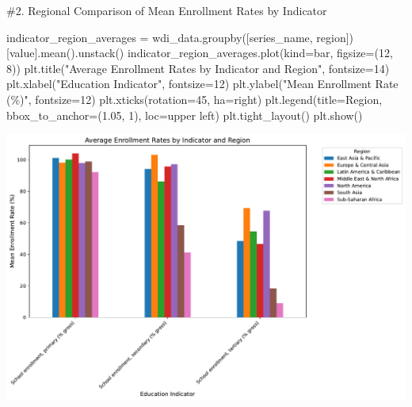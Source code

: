 \documentclass[
  letterpaper,
  DIV=11,
  numbers=noendperiod]{scrartcl}
\newenvironment{Shaded}{\begin{snugshade}}{\end{snugshade}}
\newcommand{\CommentTok}[1]{\textcolor[rgb]{0.37,0.37,0.37}{#1}}
\newcommand{\DecValTok}[1]{\textcolor[rgb]{0.68,0.00,0.00}{#1}}
\newcommand{\FloatTok}[1]{\textcolor[rgb]{0.68,0.00,0.00}{#1}}
\newcommand{\NormalTok}[1]{\textcolor[rgb]{0.00,0.23,0.31}{#1}}
\newcommand{\OperatorTok}[1]{\textcolor[rgb]{0.37,0.37,0.37}{#1}}
\newcommand{\StringTok}[1]{\textcolor[rgb]{0.13,0.47,0.30}{#1}}
\begin{document}
\begin{Shaded}
\begin{Highlighting}[]
\CommentTok{\#2. Regional Comparison of Mean Enrollment Rates by Indicator}

\NormalTok{indicator\_region\_averages }\OperatorTok{=}\NormalTok{ wdi\_data.groupby([}\StringTok{\textquotesingle{}series\_name\textquotesingle{}}\NormalTok{, }\StringTok{\textquotesingle{}region\textquotesingle{}}\NormalTok{])[}\StringTok{\textquotesingle{}value\textquotesingle{}}\NormalTok{].mean().unstack()}
\NormalTok{indicator\_region\_averages.plot(kind}\OperatorTok{=}\StringTok{\textquotesingle{}bar\textquotesingle{}}\NormalTok{, figsize}\OperatorTok{=}\NormalTok{(}\DecValTok{12}\NormalTok{, }\DecValTok{8}\NormalTok{))}
\NormalTok{plt.title(}\StringTok{"Average Enrollment Rates by Indicator and Region"}\NormalTok{, fontsize}\OperatorTok{=}\DecValTok{14}\NormalTok{)}
\NormalTok{plt.xlabel(}\StringTok{"Education Indicator"}\NormalTok{, fontsize}\OperatorTok{=}\DecValTok{12}\NormalTok{)}
\NormalTok{plt.ylabel(}\StringTok{"Mean Enrollment Rate (\%)"}\NormalTok{, fontsize}\OperatorTok{=}\DecValTok{12}\NormalTok{)}
\NormalTok{plt.xticks(rotation}\OperatorTok{=}\DecValTok{45}\NormalTok{, ha}\OperatorTok{=}\StringTok{\textquotesingle{}right\textquotesingle{}}\NormalTok{)}
\NormalTok{plt.legend(title}\OperatorTok{=}\StringTok{\textquotesingle{}Region\textquotesingle{}}\NormalTok{, bbox\_to\_anchor}\OperatorTok{=}\NormalTok{(}\FloatTok{1.05}\NormalTok{, }\DecValTok{1}\NormalTok{), loc}\OperatorTok{=}\StringTok{\textquotesingle{}upper left\textquotesingle{}}\NormalTok{)}
\NormalTok{plt.tight\_layout()}
\NormalTok{plt.show()}
\end{Highlighting}
\end{Shaded}

\includegraphics{report_files/figure-pdf/cell-4-output-1.pdf}
\end{document}
